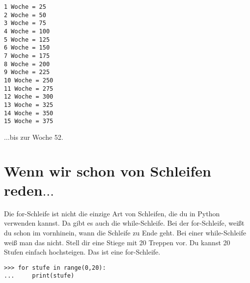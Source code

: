 \begin{listing}
\begin{verbatim}
1 Woche = 25
2 Woche = 50
3 Woche = 75
4 Woche = 100
5 Woche = 125
6 Woche = 150
7 Woche = 175
8 Woche = 200
9 Woche = 225
10 Woche = 250
11 Woche = 275
12 Woche = 300
13 Woche = 325
14 Woche = 350
15 Woche = 375
\end{verbatim}
\end{listing}

$\ldots$bis zur Woche 52.

\section{Wenn wir schon von Schleifen reden$\ldots$}

Die for-Schleife ist nicht die einzige Art von Schleifen, die du in Python verwenden kannst. Da gibt es auch die while-Schleife. Bei der for-Schleife, weißt du schon im vornhinein, wann die Schleife zu Ende geht. Bei einer while-Schleife weiß man das nicht. Stell dir eine Stiege mit 20 Treppen vor. Du kannst 20 Stufen einfach hochsteigen. Das ist eine for-Schleife.

\begin{listing}
\begin{verbatim}
>>> for stufe in range(0,20):
...     print(stufe)
\end{verbatim}
\end{listing}

